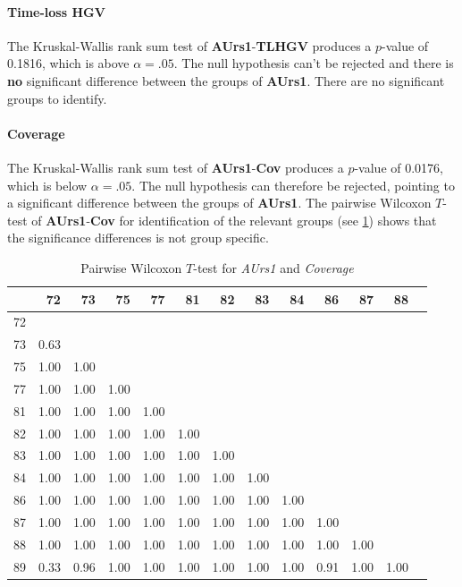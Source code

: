 \paragraph{Time-loss HGV}
The Kruskal-Wallis rank sum test of \textbf{AUrs1}-\textbf{TLHGV} produces a $p$-value of 0.1816, which is above $\alpha=.05$. The null hypothesis can't be rejected and there is \textbf{no} significant difference between the groups of \textbf{AUrs1}. There are no significant groups to identify.

\paragraph{Coverage}
The Kruskal-Wallis rank sum test of \textbf{AUrs1}-\textbf{Cov} produces a $p$-value of 0.0176, which is below $\alpha=.05$. The null hypothesis can therefore be rejected, pointing to a significant difference between the groups of \textbf{AUrs1}. The pairwise Wilcoxon $T$-test of \textbf{AUrs1}-\textbf{Cov} for identification of the relevant groups (see \cref{tbl:wilcoxon_baysis_initiator_AUrs1_Cov}) shows that the significance differences is not group specific.
\begin{table}[ht]
	\small
	\centering
    \begin{tabular}{rrrrrrrrrrrrr}
        \toprule
           & 72 & 73 & 75 & 77 & 81 & 82 & 83 & 84 & 86 & 87 & 88 \\ 
        \midrule
        72 &  &  &  &  &  &  &  &  &  &  &  \\ 
        73 & 0.63 &  &  &  &  &  &  &  &  &  &  \\ 
        75 & 1.00 & 1.00 &  &  &  &  &  &  &  &  &  \\ 
        77 & 1.00 & 1.00 & 1.00 &  &  &  &  &  &  &  &  \\ 
        81 & 1.00 & 1.00 & 1.00 & 1.00 &  &  &  &  &  &  &  \\ 
        82 & 1.00 & 1.00 & 1.00 & 1.00 & 1.00 &  &  &  &  &  &  \\ 
        83 & 1.00 & 1.00 & 1.00 & 1.00 & 1.00 & 1.00 &  &  &  &  &  \\ 
        84 & 1.00 & 1.00 & 1.00 & 1.00 & 1.00 & 1.00 & 1.00 &  &  &  &  \\ 
        86 & 1.00 & 1.00 & 1.00 & 1.00 & 1.00 & 1.00 & 1.00 & 1.00 &  &  &  \\ 
        87 & 1.00 & 1.00 & 1.00 & 1.00 & 1.00 & 1.00 & 1.00 & 1.00 & 1.00 &  &  \\ 
        88 & 1.00 & 1.00 & 1.00 & 1.00 & 1.00 & 1.00 & 1.00 & 1.00 & 1.00 & 1.00 &  \\ 
        89 & 0.33 & 0.96 & 1.00 & 1.00 & 1.00 & 1.00 & 1.00 & 1.00 & 0.91 & 1.00 & 1.00 \\ 
        \bottomrule
    \end{tabular}
    \caption{Pairwise Wilcoxon $T$-test for \textit{AUrs1} and \textit{Coverage}}
    \label{tbl:wilcoxon_baysis_initiator_AUrs1_Cov}
\end{table}

